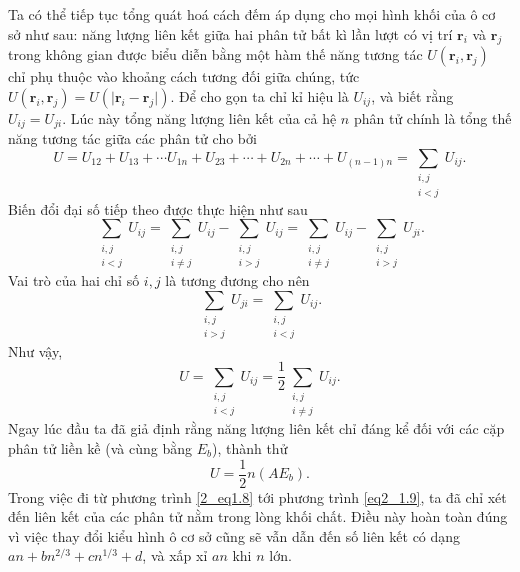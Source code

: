 \begin{enumerate}[label=(\alph*)]
    Ta có thể tiếp tục tổng quát hoá cách đếm  áp dụng cho mọi hình khối của ô cơ sở như sau: năng lượng liên kết giữa hai phân tử bất kì lần lượt có vị trí \(\mathbf r_i\) và \(\mathbf r_j\) trong không gian được biểu diễn bằng một hàm thế năng tương tác $U(\mathbf r_i, \mathbf r_j)$ chỉ phụ thuộc vào khoảng cách tương đối giữa chúng, tức $U(\mathbf r_i, \mathbf r_j)=U(\lvert \mathbf r_i -\mathbf r_j\rvert)$. Để cho gọn ta chỉ kỉ hiệu là $U_{ij}$, và biết rằng $U_{ij}=U_{ji}$. Lúc này tổng năng lượng liên kết của cả hệ $n$ phân tử chính là tổng thế năng tương tác giữa các phân tử cho bởi \begin{equation}U=U_{12}+U_{13}+\cdots U_{1n}+U_{23}+\cdots+U_{2n}+\cdots+U_{(n-1)n}=\sum_{\substack{i,j \\ i<j}}U_{ij}.\end{equation} Biến đổi đại số tiếp theo được thực hiện như sau \begin{equation}\sum_{\substack{i,j \\ i<j}}U_{ij}=\sum_{\substack{i,j\\i\neq j}}U_{ij}-\sum_{\substack{i,j \\ i>j}}U_{ij}=\sum_{\substack{i,j\\i\neq j}}U_{ij}-\sum_{\substack{i,j \\ i>j}}U_{ji}.\end{equation} Vai trò của hai chỉ số $i,j$ là tương đương cho nên \begin{equation}\sum_{\substack{i,j \\ i>j}}U_{ji}=\sum_{\substack{i,j \\ i<j}}U_{ij}.\end{equation} Như vậy, \begin{equation}\label{2_eq1.8}U=\sum_{\substack{i,j \\ i<j}}U_{ij}=\frac{1}{2}\sum_{\substack{i,j \\ i\neq j}}U_{ij}.\end{equation}  Ngay lúc đầu ta đã giả định rằng năng lượng liên kết chỉ đáng kể đối với các cặp phân tử liền kề (và cùng bằng $E_b$), thành thử \begin{equation}\label{eq2_1.9}
        U=\frac{1}{2}n(AE_b).\end{equation}  Trong việc đi từ phương trình \ref{2_eq1.8} tới phương trình \ref{eq2_1.9}, ta đã chỉ xét đến liên kết của các phân tử nằm trong lòng khối chất. Điều này hoàn toàn đúng vì việc thay đổi kiểu hình ô cơ sở cũng sẽ vẫn dẫn đến số liên kết có dạng $an+bn^{2/3}+cn^{1/3}+d$, và xấp xỉ $an$ khi $n$ lớn. \newline

\end{enumerate}
